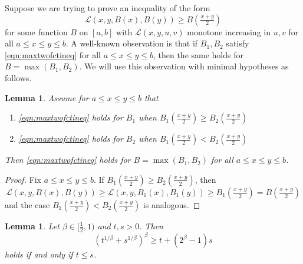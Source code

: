 \documentclass[12pt]{amsart}
\theoremstyle{plain}
\newtheorem{lem}[thm]{Lemma}
\theoremstyle{definition}
\theoremstyle{remark}
\numberwithin{equation}{section}
\begin{document}
Suppose we are trying to prove an inequality of the form
\begin{equation}\label{eqn:maxtwofctineq}
\mathcal{L}(x,y,B(x),B(y))\ge B(\tfrac{x+y}{2})
\end{equation} 
for some function $B$ on $[a,b]$ with $\mathcal{L}(x,y,u,v)$ monotone increasing in $u,v$ for all $a\le x\le y\le b$.
A well-known observation is that if $B_1,B_2$ satisfy \eqref{eqn:maxtwofctineq} for all $a\le x\le y\le b$, then the same holds for $B=\max(B_1,B_2)$. We will use this observation with minimal hypotheses as follows.

\begin{lem}\label{lem:maxlemma2}
Assume for $a\le x\le y\le b$ that
\begin{enumerate}
\item \eqref{eqn:maxtwofctineq} holds for $B_1$ when $B_1(\frac{x+y}{2})\ge B_2(\frac{x+y}2)$
\item \eqref{eqn:maxtwofctineq} holds for $B_2$ when $B_1(\frac{x+y}{2})< B_2(\frac{x+y}2)$
\end{enumerate}
Then \eqref{eqn:maxtwofctineq} holds for $B=\max(B_1,B_2)$ for all $a\le x\le y\le b$.
\end{lem}

\begin{proof}
Fix $a\le x\le y\le b$. If $B_1(\frac{x+y}{2})\ge B_2(\frac{x+y}2)$, then
\[ \mathcal{L}(x,y,B(x),B(y))\ge \mathcal{L}(x,y,B_1(x),B_1(y)) \ge B_1(\tfrac{x+y}{2}) = B(\tfrac{x+y}{2}) \]
and the case $B_1(\frac{x+y}{2})< B_2(\frac{x+y}2)$ is analogous.
\end{proof}


\begin{lem}\label{lem:GLvsGR}
Let $\beta\in [\frac12,1)$ 
and $t,s>0$.  Then
\[ (t^{1/\beta}+s^{1/\beta})^\beta \ge t + (2^\beta-1) s\] 
holds if and only if $t\le s$.
\end{lem}
\end{document}
